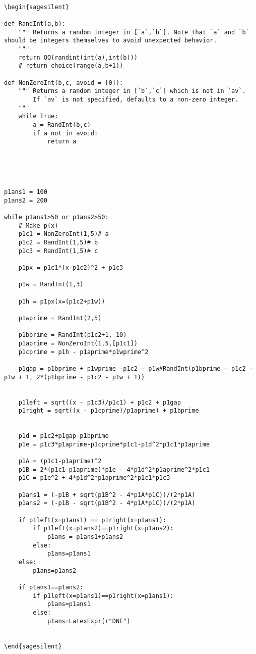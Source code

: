 \documentclass{ximera}
\begin{document}
\begin{verbatim}

\begin{sagesilent}

def RandInt(a,b):
    """ Returns a random integer in [`a`,`b`]. Note that `a` and `b` should be integers themselves to avoid unexpected behavior.
    """
    return QQ(randint(int(a),int(b)))
    # return choice(range(a,b+1))

def NonZeroInt(b,c, avoid = [0]):
    """ Returns a random integer in [`b`,`c`] which is not in `av`. 
        If `av` is not specified, defaults to a non-zero integer.
    """
    while True:
        a = RandInt(b,c)
        if a not in avoid:
            return a





p1ans1 = 100
p1ans2 = 200

while p1ans1>50 or p1ans2>50:
    # Make p(x)
    p1c1 = NonZeroInt(1,5)# a
    p1c2 = RandInt(1,5)# b
    p1c3 = RandInt(1,5)# c
    
    p1px = p1c1*(x-p1c2)^2 + p1c3
    
    p1w = RandInt(1,3)
    
    p1h = p1px(x=(p1c2+p1w))
    
    p1wprime = RandInt(2,5)
    
    p1bprime = RandInt(p1c2+1, 10)
    p1aprime = NonZeroInt(1,5,[p1c1])
    p1cprime = p1h - p1aprime*p1wprime^2
    
    p1gap = p1bprime + p1wprime -p1c2 - p1w#RandInt(p1bprime - p1c2 - p1w + 1, 2*(p1bprime - p1c2 - p1w + 1))
    
    
    p1left = sqrt((x - p1c3)/p1c1) + p1c2 + p1gap
    p1right = sqrt((x - p1cprime)/p1aprime) + p1bprime
    
    
    p1d = p1c2+p1gap-p1bprime
    p1e = p1c3*p1aprime-p1cprime*p1c1-p1d^2*p1c1*p1aprime
    
    p1A = (p1c1-p1aprime)^2
    p1B = 2*(p1c1-p1aprime)*p1e - 4*p1d^2*p1aprime^2*p1c1
    p1C = p1e^2 + 4*p1d^2*p1aprime^2*p1c1*p1c3
    
    p1ans1 = (-p1B + sqrt(p1B^2 - 4*p1A*p1C))/(2*p1A)
    p1ans2 = (-p1B - sqrt(p1B^2 - 4*p1A*p1C))/(2*p1A)
    
    if p1left(x=p1ans1) == p1right(x=p1ans1):
        if p1left(x=p1ans2)==p1right(x=p1ans2):
            p1ans = p1ans1+p1ans2
        else:
            p1ans=p1ans1
    else:
        p1ans=p1ans2
    
    if p1ans1==p1ans2:
        if p1left(x=p1ans1)==p1right(x=p1ans1):
            p1ans=p1ans1
        else:
            p1ans=LatexExpr(r"DNE")


\end{sagesilent}

\end{verbatim}
\end{document}
